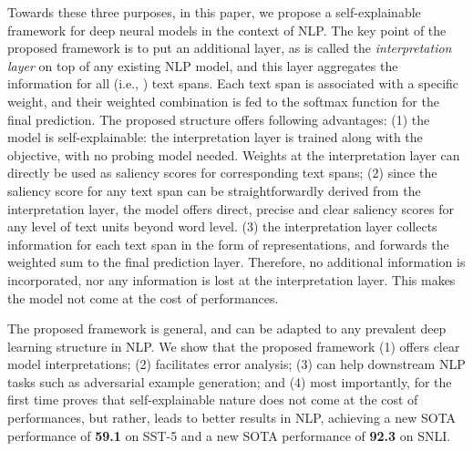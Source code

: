 \documentclass[11pt,a4paper]{article}
\begin{document}
Towards these three purposes, in this paper, we propose a self-explainable framework for deep neural models in the context of NLP. 
The key point of the proposed framework is to put an additional layer, as is called the {\it interpretation layer} on top of any existing NLP model,  
and this layer aggregates the information for all  (i.e., ) text spans. 
Each text span is  associated with a specific weight, and their weighted combination is fed to the softmax function for the final prediction. 
The proposed 
 structure offers  following advantages:
(1) the model is self-explainable: 
the interpretation layer is trained along with the objective, with no  probing model needed. 
 Weights at the interpretation layer can directly be used as saliency scores for  corresponding text spans; 
(2) since the saliency score for any text span can be straightforwardly derived from the interpretation layer,  
the model offers direct,  precise and clear saliency scores for any  level of text units beyond word level. 
 (3) the interpretation layer collects information for each text span in the form of representations, and forwards the weighted sum to the final prediction layer. 
Therefore, no additional information is incorporated, nor any information is lost at the interpretation layer. This makes the model not come at the cost of performances. 

The proposed framework is general, and can be adapted to any prevalent deep learning structure in NLP.
We show that the proposed framework (1) offers clear model interpretations; 
(2) facilitates error analysis; 
(3) can help   downstream NLP tasks such as adversarial example generation; and 
(4) most importantly, for the first time proves that self-explainable nature does not come at the cost of performances, but rather, 
leads to better results in NLP,  
 achieving a new SOTA performance of {\bf 59.1} on SST-5 and 
  a new SOTA performance of {\bf 92.3} 
 on SNLI.


\begin{comment}
The rest of this work is organized as follows: related work is detailed in Section 2.
The proposed self-explaining framework is illustrated in Section 3.
Evaluation methods and experimental results are respectively shown in Section 4 and 5, followed by a brief conclusion in Section 6. 
\end{comment}
\end{document}
